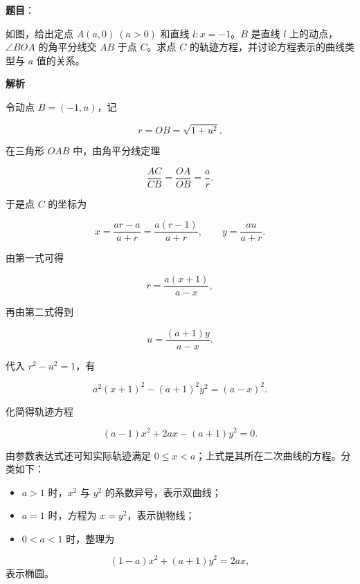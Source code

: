 \begin{answer}

\textbf{题目}：

如图，给出定点 $A(a,0)\ (a>0)$ 和直线 $l:x=-1$。$B$ 是直线 $l$ 上的动点，$\angle BOA$ 的角平分线交 $AB$ 于点 $C$。求点 $C$ 的轨迹方程，并讨论方程表示的曲线类型与 $a$ 值的关系。
\nopagebreak[4]
\begin{center}\end{center}
\nopagebreak[4]
\textbf{解析}

令动点 $B=(-1,u)$，记

\nopagebreak[4]
\[
r=OB=\sqrt{1+u^2}.
\]

在三角形 $OAB$ 中，由角平分线定理

\nopagebreak[4]
\[
\frac{AC}{CB}=\frac{OA}{OB}=\frac ar.
\]

于是点 $C$ 的坐标为

\nopagebreak[4]
\[
x=\frac{ar-a}{a+r}
=\frac{a(r-1)}{a+r},
\qquad
y=\frac{au}{a+r}.
\]

由第一式可得

\nopagebreak[4]
\[
r=\frac{a(x+1)}{a-x},
\]

再由第二式得到

\nopagebreak[4]
\[
u=\frac{(a+1)y}{a-x}.
\]

代入 $r^2-u^2=1$，有

\nopagebreak[4]
\[
a^2(x+1)^2-(a+1)^2y^2=(a-x)^2.
\]

化简得轨迹方程

\nopagebreak[4]
\[
(a-1)x^2+2ax-(a+1)y^2=0.
\]

由参数表达式还可知实际轨迹满足 $0\le x<a$；上式是其所在二次曲线的方程。分类如下：

\begin{itemize}
\item $a>1$ 时，$x^2$ 与 $y^2$ 的系数异号，表示双曲线；
\item $a=1$ 时，方程为 $x=y^2$，表示抛物线；
\item $0<a<1$ 时，整理为
\end{itemize}
\nopagebreak[4]
\[
  (1-a)x^2+(a+1)y^2=2ax,
\]
  表示椭圆。


\end{answer}
